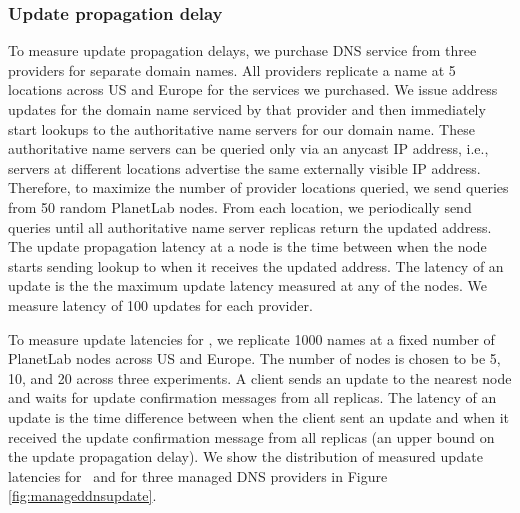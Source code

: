 



\subsubsection{Update propagation delay} 
To measure update propagation delays, we purchase DNS service from three providers for separate domain names.  All providers replicate a name at 5 locations across US and Europe for the services we purchased. We issue address updates for the domain name serviced by that provider and then immediately start lookups to the authoritative name servers for our domain name.
These authoritative name servers can be queried only via an anycast IP address, i.e., servers at different locations advertise the same externally visible IP address. Therefore, to maximize the number of provider locations queried, we send queries from 50 random PlanetLab nodes. From each location, we periodically send queries until all authoritative name server replicas return the updated address.  The update propagation latency at a node is the time between when the node starts sending lookup to when it receives the updated address. The latency of an update is the the maximum update latency measured at any of the nodes. We measure latency of 100 updates for each provider.

To measure update latencies for \auspice, we replicate 1000 names at a fixed number of PlanetLab nodes across US and Europe. The number of nodes is chosen to be 5, 10, and 20 across three experiments. A client sends an update to the nearest node and waits for update confirmation messages from all replicas. The latency of an update is the time difference between when the client sent an update and when it received the update confirmation message from all replicas (an upper bound on the update propagation delay).  We show the distribution of measured update latencies for \auspice\ and for three managed DNS providers in Figure \ref{fig:manageddnsupdate}.   

